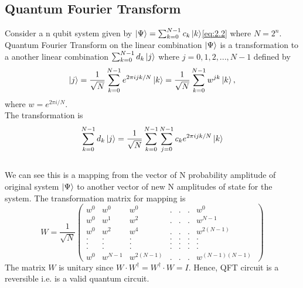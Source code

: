 \subsection{Quantum Fourier Transform}
Consider a n qubit system given by $\ket{\Psi} = \sum_{k=0}^{N-1} c_{k}\ket{k}$\eqref {eq:2.2} where $N=2^{n}$. Quantum Fourier Transform on the linear combination $\ket{\Psi}$ is a transformation to a another linear combination $\sum_{k=0}^{N-1} d_{k}\ket{j}$ where $j = 0,1,2,...,N-1$ defined by
\begin{equation}
     \ket{j} = \frac{1}{\sqrt{N}}\sum_{k=0}^{N-1} e^{2\pi ijk/N}\ket{k}  = \frac{1}{\sqrt{N}} \sum_{k=0}^{N-1} w^{jk} \ket{k},
\end{equation}where $w = e^{2\pi i/N}$.\\
The transformation is 
\begin{equation}
    \sum_{k=0}^{N-1} d_{k}\ket{j} = \frac{1}{\sqrt{N}} \sum_{k=0}^{N-1} \sum_{j=0}^{N-1} c_k e^{2\pi ijk/N}\ket{k}
\end{equation}\cite{loceff2015}\\
We can see this is a mapping from the vector of N probability amplitude of original system $\ket{\Psi}$ to another vector of new N amplitudes of state for the system. The transformation matrix  for mapping is
\begin{equation}
    W =\frac{1}{\sqrt{N}}
    \begin{pmatrix}
        w^{0} &w^{0} &w^{0} &. &.&. &w^{0}\\
        w^{0} &w^{1} &w^{2} &. &.&. &w^{N-1}\\
        w^{0} &w^{2} &w^{4} &. &.&. &w^{2(N-1)}\\
        . &. &.&.&.&.&.\\
        . &. &.&.&.&.&.\\
        . &. &.&.&.&.&.\\
        w^{0} &w^{N-1} &w^{2(N-1)}  &. &.&. &w^{(N-1)(N-1)}\
    \end{pmatrix}\label{eq:2.9}
\end{equation}
The matrix $W$ is unitary since $W\cdot W^{\dag} = W^{\dag} \cdot W = I$. Hence, QFT circuit is a reversible i.e. is a valid quantum circuit. 

